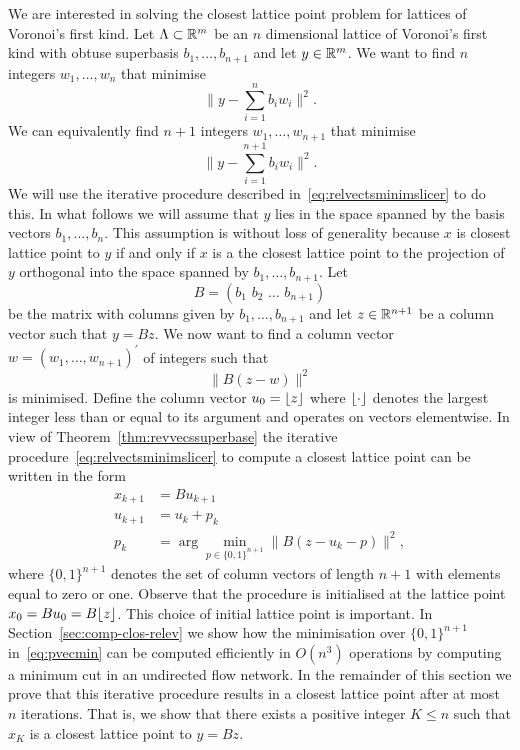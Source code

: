 \documentclass[final,leqno]{siamltex}
\begin{document}
We are interested in solving the closest lattice point problem for lattices of Voronoi's first kind.  Let $\Lambda \subset {\mathbb R}^m$ be an $n$ dimensional lattice of Voronoi's first kind with obtuse superbasis $b_1,\dots,b_{n+1}$ and let $y \in {\mathbb R}^m$.  We want to find $n$ integers $w_1,\dots,w_n$ that minimise
\[
\| y - \sum_{i=1}^n b_i w_i \|^2.
\]
We can equivalently find $n+1$ integers $w_1,\dots,w_{n+1}$ that minimise
\[
\| y - \sum_{i=1}^{n+1} b_i w_i \|^2.
\]
We will use the iterative procedure described in~\eqref{eq:relvectsminimslicer} to do this.  In what follows we will assume that $y$ lies in the space spanned by the basis vectors $b_1,\dots,b_{n}$.  This assumption is without loss of generality because $x$ is closest lattice point to $y$ if and only if $x$ is a the closest lattice point to the projection of $y$ orthogonal into the space spanned by $b_1,\dots,b_{n+1}$.  Let
\begin{equation}\label{eq:matrxBobtusebasis}
B = (b_1\,\,b_2\,\,\dots\,\,b_{n+1})
\end{equation}
be the matrix with columns given by $b_1,\dots,b_{n+1}$ and let $z \in {\mathbb R}^{n+1}$ be a column vector such that $y = Bz$.  We now want to find a column vector $w = (w_1,\dots,w_{n+1})^\prime$ of integers such that
\begin{equation}\label{eq:tominimise}
\| B(z  -  w) \|^2
\end{equation}
is minimised.  Define the column vector $u_0 = {\left\lfloor z \right\rfloor}$ where ${\left\lfloor \cdot \right\rfloor}$ denotes the largest integer less than or equal to its argument and operates on vectors elementwise. In view of Theorem~\ref{thm:revvecssuperbase} the iterative procedure~\eqref{eq:relvectsminimslicer} to compute a closest lattice point can be written in the form
\begin{align}
x_{k+1} &= B u_{k+1} \label{eq:xseqfirsttype}  \\
u_{k+1} &= u_k + p_k \nonumber \\
p_k &= \arg\min_{p \in \{0,1\}^{n+1}}\| B(z - u_k - p) \|^2, \label{eq:pvecmin}
\end{align}
where $\{0,1\}^{n+1}$ denotes the set of column vectors of length $n+1$ with elements equal to zero or one.  Observe that the procedure is initialised at the lattice point $x_0 = Bu_0 = B{\left\lfloor z \right\rfloor}$.  This choice of initial lattice point is important.  In Section~\ref{sec:comp-clos-relev} we show how the minimisation over $\{0,1\}^{n+1}$ in~\eqref{eq:pvecmin} can be computed efficiently in $O(n^3)$ operations by computing a minimum cut in an undirected flow network.  In the remainder of this section we prove that this iterative procedure results in a closest lattice point after at most $n$ iterations.  That is, we show that there exists a positive integer $K \leq n$ such that $x_K$ is a closest lattice point to $y = Bz$.
\end{document}
